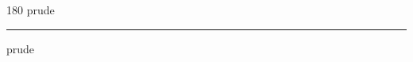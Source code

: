 
\begin{frame}
\begin{center}
\begin{turn}{180}
{\fontsize{2.5cm}{1em}\selectfont prude}
\end{turn}
\vspace{1em}\par  
\hrule
\vspace{1em}\par  
{\fontsize{2.5cm}{1em}\selectfont prude}
\end{center}
\end{frame}
